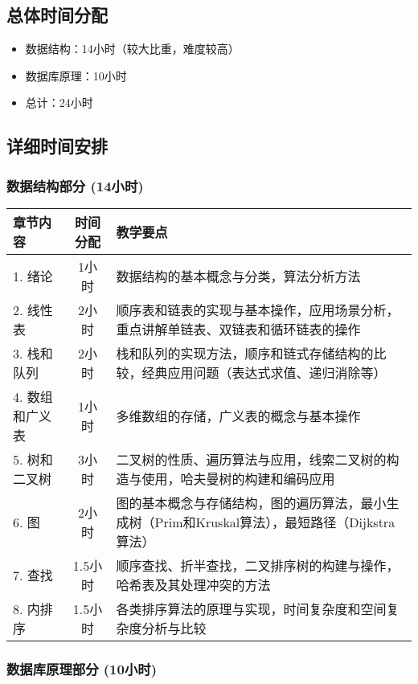 \documentclass{../note}
\begin{document}
\subsection{总体时间分配}
\begin{itemize}
  \item 数据结构：14小时（较大比重，难度较高）
  \item 数据库原理：10小时
  \item 总计：24小时
\end{itemize}

\subsection{详细时间安排}

\subsubsection{数据结构部分 (14小时)}

\begin{tabular}{|l|c|p{8cm}|}
  \hline
  \textbf{章节内容} & \textbf{时间分配} & \textbf{教学要点} \\
  \hline
  1. 绪论 & 1小时 &
  数据结构的基本概念与分类，算法分析方法 \\
  \hline
  2. 线性表 & 2小时 &
  顺序表和链表的实现与基本操作，应用场景分析，重点讲解单链表、双链表和循环链表的操作 \\
  \hline
  3. 栈和队列 & 2小时 &
  栈和队列的实现方法，顺序和链式存储结构的比较，经典应用问题（表达式求值、递归消除等） \\
  \hline
  4. 数组和广义表 & 1小时 &
  多维数组的存储，广义表的概念与基本操作 \\
  \hline
  5. 树和二叉树 & 3小时 &
  二叉树的性质、遍历算法与应用，线索二叉树的构造与使用，哈夫曼树的构建和编码应用 \\
  \hline
  6. 图 & 2小时 &
  图的基本概念与存储结构，图的遍历算法，最小生成树（Prim和Kruskal算法），最短路径（Dijkstra算法） \\
  \hline
  7. 查找 & 1.5小时 &
  顺序查找、折半查找，二叉排序树的构建与操作，哈希表及其处理冲突的方法 \\
  \hline
  8. 内排序 & 1.5小时 &
  各类排序算法的原理与实现，时间复杂度和空间复杂度分析与比较 \\
  \hline
\end{tabular}

\subsubsection{数据库原理部分 (10小时)}
\end{document}
